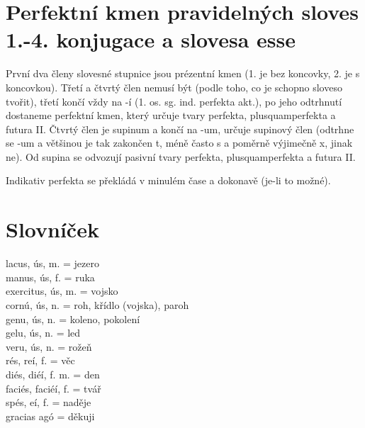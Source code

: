 \documentclass[12pt]{article}					%
\begin{document}
\section{Perfektní kmen pravidelných sloves 1.-4. konjugace a slovesa esse}
První dva členy slovesné stupnice jsou prézentní kmen (1. je bez koncovky, 2. je s koncovkou). Třetí a čtvrtý člen nemusí být (podle toho, co je schopno sloveso tvořit), třetí končí vždy na -í (1. os. sg. ind. perfekta akt.), po jeho odtrhnutí dostaneme perfektní kmen, který určuje tvary perfekta, plusquamperfekta a futura II. Čtvrtý člen je supinum a končí na -um, určuje supinový člen (odtrhne se -um a většinou je tak zakončen t, méně často s a poměrně výjimečně x, jinak ne). Od supina se odvozují pasivní tvary perfekta, plusquamperfekta a futura II.

Indikativ perfekta se překládá v minulém čase a dokonavě (je-li to možné).

\newpage
\section{Slovníček}
    lacus, ús, m. = jezero\\
    manus, ús, f. = ruka\\
    exercitus, ús, m. = vojsko\\
    cornú, ús, n. = roh, křídlo (vojska), paroh\\
    genu, ús, n. = koleno, pokolení\\
    gelu, ús, n. = led\\
    veru, ús, n. = rožeň\\
    rés, reí, f. = věc\\
    diés, diéí, f. m. = den\\
    faciés, faciéí, f. = tvář\\
    spés, eí, f. = naděje\\
    gracias agó = děkuji\\

    

    
\end{document}
